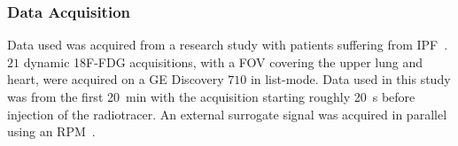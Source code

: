             \subsubsection{Data Acquisition} \label{sec:pca_data_driven_surrogate_signal_extraction_methods_for_dynamic_pet_evaluation_data_acquisition}
                Data used was acquired from a research study with patients suffering from \gls{IPF}~\parencite{Emond2020EffectReconstruction}. $21$ dynamic \gls{18F-FDG} acquisitions, with a \gls{FOV} covering the upper lung and heart, were acquired on a \gls{GE} Discovery $710$ in list-mode. Data used in this study was from the first \SI{20}{\minute} with the acquisition starting roughly \SI{20}{\second} before injection of the radiotracer. An external surrogate signal was acquired in parallel using an \gls{RPM}~\parencite{Oh2019OptimalTreatment}.

